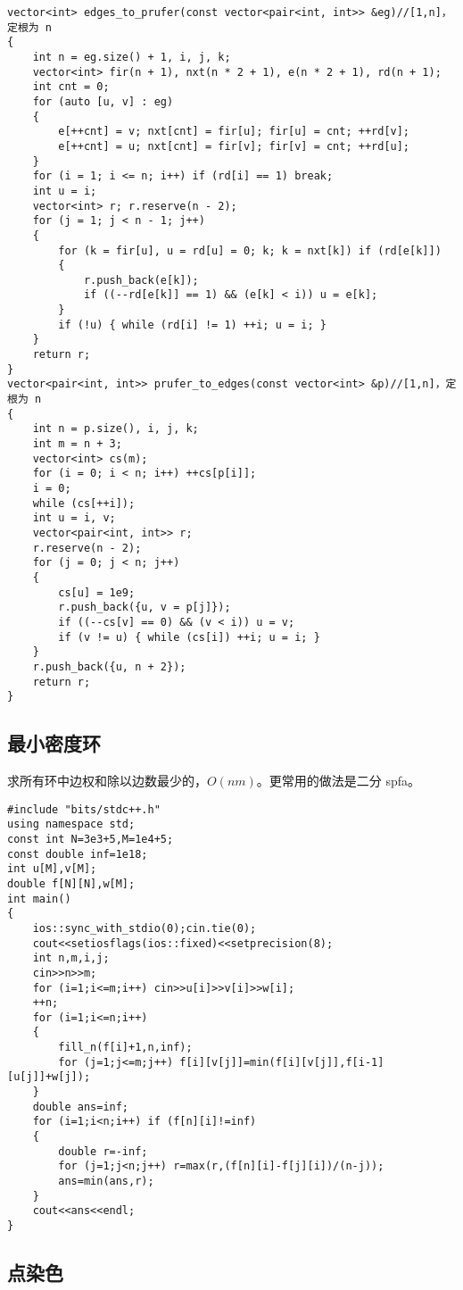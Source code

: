 \documentclass[12pt]{ctexart}
\begin{document}
\begin{lstlisting}
vector<int> edges_to_prufer(const vector<pair<int, int>> &eg)//[1,n]，定根为 n
{
	int n = eg.size() + 1, i, j, k;
	vector<int> fir(n + 1), nxt(n * 2 + 1), e(n * 2 + 1), rd(n + 1);
	int cnt = 0;
	for (auto [u, v] : eg)
	{
		e[++cnt] = v; nxt[cnt] = fir[u]; fir[u] = cnt; ++rd[v];
		e[++cnt] = u; nxt[cnt] = fir[v]; fir[v] = cnt; ++rd[u];
	}
	for (i = 1; i <= n; i++) if (rd[i] == 1) break;
	int u = i;
	vector<int> r; r.reserve(n - 2);
	for (j = 1; j < n - 1; j++)
	{
		for (k = fir[u], u = rd[u] = 0; k; k = nxt[k]) if (rd[e[k]])
		{
			r.push_back(e[k]);
			if ((--rd[e[k]] == 1) && (e[k] < i)) u = e[k];
		}
		if (!u) { while (rd[i] != 1) ++i; u = i; }
	}
	return r;
}
vector<pair<int, int>> prufer_to_edges(const vector<int> &p)//[1,n]，定根为 n
{
	int n = p.size(), i, j, k;
	int m = n + 3;
	vector<int> cs(m);
	for (i = 0; i < n; i++) ++cs[p[i]];
	i = 0;
	while (cs[++i]);
	int u = i, v;
	vector<pair<int, int>> r;
	r.reserve(n - 2);
	for (j = 0; j < n; j++)
	{
		cs[u] = 1e9;
		r.push_back({u, v = p[j]});
		if ((--cs[v] == 0) && (v < i)) u = v;
		if (v != u) { while (cs[i]) ++i; u = i; }
	}
	r.push_back({u, n + 2});
	return r;
}

\end{lstlisting}


\subsection{最小密度环}

求所有环中边权和除以边数最少的，$O(nm)$。更常用的做法是二分 spfa。

\begin{lstlisting}
#include "bits/stdc++.h"
using namespace std;
const int N=3e3+5,M=1e4+5;
const double inf=1e18;
int u[M],v[M];
double f[N][N],w[M];
int main()
{
	ios::sync_with_stdio(0);cin.tie(0);
	cout<<setiosflags(ios::fixed)<<setprecision(8);
	int n,m,i,j;
	cin>>n>>m;
	for (i=1;i<=m;i++) cin>>u[i]>>v[i]>>w[i];
	++n;
	for (i=1;i<=n;i++)
	{
		fill_n(f[i]+1,n,inf);
		for (j=1;j<=m;j++) f[i][v[j]]=min(f[i][v[j]],f[i-1][u[j]]+w[j]);
	}
	double ans=inf;
	for (i=1;i<n;i++) if (f[n][i]!=inf)
	{
		double r=-inf;
		for (j=1;j<n;j++) r=max(r,(f[n][i]-f[j][i])/(n-j));
		ans=min(ans,r);
	}
	cout<<ans<<endl;
}
\end{lstlisting}


\subsection{点染色}
\end{document}
